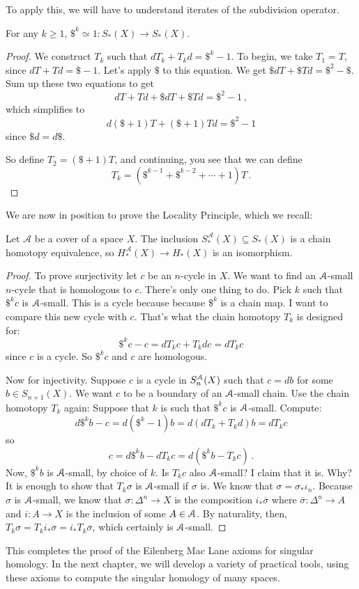 To apply this, we will have to understand iterates of the subdivision operator.

\begin{lemma} For any $k\geq1$,
$\$^k\simeq 1:S_\ast(X)\to S_\ast(X)$.
\end{lemma}
\begin{proof}
We construct $T_k$ such that $dT_k+T_kd=\$^k-1$. To begin, we take $T_1=T$, since $dT+Td=\$-1$. Let's apply $\$$ to this equation. We get $\$dT+\$Td=\$^2-\$$. Sum up these two equations to get 
\[
dT+Td+\$dT+\$Td = \$^2-1\,,
\] 
which simplifies to 
\[
d(\$+1)T+(\$+1)Td=\$^2-1
\]
since $\$d=d\$$.

So define $T_2=(\$+1)T$, and continuing, you see that we can define
\[
T_k=(\$^{k-1}+\$^{k-2}+\cdots+1)T\,.
\]
\end{proof}

We are now in position to prove the Locality Principle, which we recall:
\begin{theorem}
Let $\mathscr{A}$ be a cover of a space $X$. 
The inclusion $S^\mathscr{A}_\ast(X)\subseteq S_\ast(X)$ is a chain homotopy equivalence, so $H^\mathscr{A}_\ast(X)\to H_\ast(X)$ is an isomorphism.
\end{theorem}
\begin{proof}
To prove surjectivity let $c$ be an $n$-cycle in $X$. We want to find an $\mathcal{A}$-small $n$-cycle that is homologous to $c$. There's only one thing to do. Pick $k$ such that $\$^k c$ is $\mathcal{A}$-small. This is a cycle because because $\$^k$ is a chain map. I want to compare this new cycle with $c$. That's what the chain homotopy $T_k$ is designed for: 
\[
\$^kc-c=dT_k c+T_kdc=dT_kc
\]
since $c$ is a cycle. So $\$^kc$ and $c$ are homologous.

Now for injectivity. Suppose $c$ is a cycle in $S^{\mathcal{A}}_n(X)$ such that $c=db$ for some $b\in S_{n+1}(X)$. We want $c$ to be a boundary of an $\mathcal{A}$-small chain. Use the chain homotopy $T_k$ again: Suppose that $k$ is such that $\$^kc$ is $\mathcal{A}$-small. Compute:
\[
d\$^kb-c=d(\$^k-1)b=d(dT_k+T_kd)b=dT_kc
\]
so 
\[
c=d\$^kb-dT_kc=d(\$^kb-T_kc)\,.
\]
Now, $\$^kb$ is $\mathcal{A}$-small, by choice of $k$. Is $T_kc$ also $\mathcal{A}$-small? I claim that it is. Why? It is enough to show that $T_k\sigma$ is $\mathcal{A}$-small if $\sigma$ is. We know that $\sigma=\sigma_\ast\iota_n$. Because $\sigma$ is $\mathcal{A}$-small, we know that $\sigma:\Delta^n\to X$ is the composition $i_\ast\overline{\sigma}$ where $\overline{\sigma}:\Delta^n\to A$ and $i:A\to X$ is the inclusion of some $A\in\mathcal{A}$. By naturality, then, $T_k\sigma=T_ki_\ast\overline{\sigma}=i_\ast T_k\overline{\sigma}$, which certainly is $\mathcal{A}$-small.
\end{proof}

This completes the proof of the Eilenberg Mac Lane axioms for singular homology. In the next chapter, we will develop a variety of practical tools, using these axioms to compute the singular homology of many spaces. 
